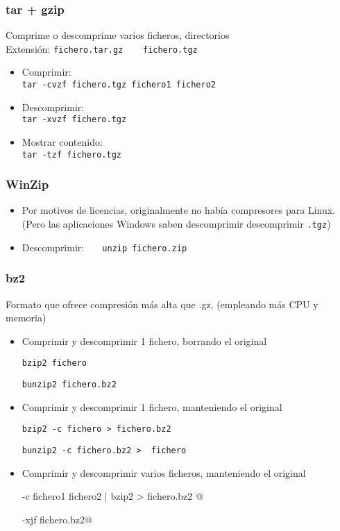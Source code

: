 \documentclass[ucs]{beamer}
\begin{document}
\begin{frame}[fragile]

\frametitle{tar + gzip}
Comprime o descomprime varios ficheros, directorios\\
Extensión: \verb|fichero.tar.gz    fichero.tgz|
\begin{itemize}	
\item
Comprimir:\\ \verb|tar -cvzf fichero.tgz fichero1 fichero2| 
\item
Descomprimir:\\ \verb|tar -xvzf fichero.tgz |
\item
Mostrar contenido:\\ \verb|tar -tzf fichero.tgz| 
\end{itemize}


\end{frame}
\begin{frame}[fragile]


\frametitle{WinZip}
\begin{itemize}	
\item 
Por motivos de licencias, originalmente no había compresores para
Linux.
(Pero las aplicaciones Windows saben descomprimir descomprimir \verb|.tgz|)
\item 
Descomprimir: 
\verb|   unzip fichero.zip |
\end{itemize}

\end{frame}


\begin{frame}[fragile]
\frametitle{bz2}
Formato que ofrece compresión más alta que .gz, (empleando 
más CPU y memoria)
\begin{itemize}	
\item 
Comprimir y descomprimir 1 fichero, borrando el original

\verb|bzip2 fichero|

\verb|bunzip2 fichero.bz2 |
\item 
Comprimir y descomprimir 1 fichero, manteniendo el original

\verb|bzip2 -c fichero > fichero.bz2|

\verb|bunzip2 -c fichero.bz2 >  fichero |
\item 
Comprimir y descomprimir varios ficheros, manteniendo el original

\verb@tar -c fichero1 fichero2  |  bzip2 > fichero.bz2  @


\verb@tar -xjf fichero.bz2@
\end{itemize}
\end{frame}
\end{document}
